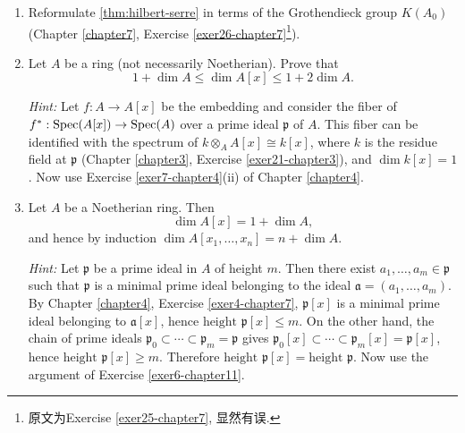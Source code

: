 \begin{enumerate}
    \item \label{exer5-chapter11}Reformulate \eqref{thm:hilbert-serre} in terms of the Grothendieck group $K(A_0)$ (Chapter \ref{chapter7}, Exercise \ref{exer26-chapter7}\footnote{原文为Exercise \ref{exer25-chapter7}, 显然有误.}).

    \item \label{exer6-chapter11}Let $A$ be a ring (not necessarily Noetherian). Prove that
    \[
    1 + \dim A \le \dim A[x] \le 1 + 2 \dim A.
    \]
    
    \textit{Hint:} Let $f: A \to A[x]$ be the embedding and consider the fiber of $f^*: \operatorname{Spec}(A[x]) \to \operatorname{Spec}(A)$ over a prime ideal $\mathfrak{p}$ of $A$. This fiber can be identified with the spectrum of $k \otimes_A A[x] \cong k[x]$, where $k$ is the residue field at $\mathfrak{p}$ (Chapter \ref{chapter3}, Exercise \ref{exer21-chapter3}), and $\dim k[x] = 1$. Now use Exercise \ref{exer7-chapter4}(ii) of Chapter \ref{chapter4}.

    \item \label{exer7-chapter11}Let $A$ be a Noetherian ring. Then
    \[
    \dim A[x] = 1 + \dim A,
    \]
    and hence by induction $\dim A[x_1, \ldots, x_n] = n + \dim A$.

    \textit{Hint:} Let $\mathfrak{p}$ be a prime ideal in $A$ of height $m$. Then there exist $a_1, \ldots, a_m \in \mathfrak{p}$ such that $\mathfrak{p}$ is a minimal prime ideal belonging to the ideal $\mathfrak{a} = (a_1, \ldots, a_m)$. By Chapter \ref{chapter4}, Exercise \ref{exer4-chapter7}, $\mathfrak{p}[x]$ is a minimal prime ideal belonging to $\mathfrak{a}[x]$, hence $\text{height } \mathfrak{p}[x] \leq m$. On the other hand, the chain of prime ideals $\mathfrak{p}_0 \subset \cdots \subset \mathfrak{p}_m = \mathfrak{p}$ gives $\mathfrak{p}_0[x] \subset \cdots \subset \mathfrak{p}_m[x] = \mathfrak{p}[x]$, hence $\text{height } \mathfrak{p}[x] \geq m$. Therefore $\text{height } \mathfrak{p}[x] = \text{height } \mathfrak{p}$. Now use the argument of Exercise \ref{exer6-chapter11}.
\end{enumerate}
